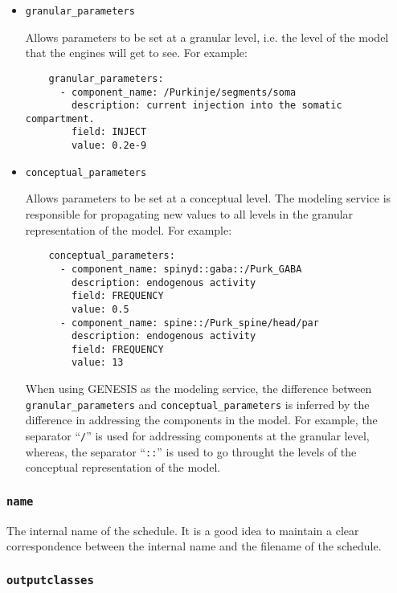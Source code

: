 \documentclass[12pt]{article}
\begin{document}
\begin{itemize}

\item[ ] {\tt granular\_parameters}

Allows parameters to be set at a granular level, i.e. the level of the model that the engines will get to see. For example: 

\begin{verbatim}
    granular_parameters:
      - component_name: /Purkinje/segments/soma
        description: current injection into the somatic compartment.
        field: INJECT
        value: 0.2e-9
\end{verbatim}

\item[ ]{\tt conceptual\_parameters}

Allows parameters to be set at a conceptual level. The modeling service is responsible for propagating new values to all levels in the granular representation of the model. For example:

\begin{verbatim}
    conceptual_parameters:
      - component_name: spinyd::gaba::/Purk_GABA
        description: endogenous activity
        field: FREQUENCY
        value: 0.5
      - component_name: spine::/Purk_spine/head/par
        description: endogenous activity
        field: FREQUENCY
        value: 13
\end{verbatim}
When using GENESIS as the modeling service, the difference between {\tt granular\_parameters} and {\tt conceptual\_parameters} is inferred by the difference in addressing the components in the model. For example, the separator ``{\tt /}'' is used for addressing components at the granular level, whereas, the separator ``{\tt ::}'' is used to go throught the levels of the conceptual representation of the model.

\end{itemize}

\subsubsection*{\tt name}

The internal name of the schedule. It is a good idea to maintain a clear correspondence between the internal name and the filename of the schedule. 

\subsubsection*{\tt outputclasses}
\end{document}
